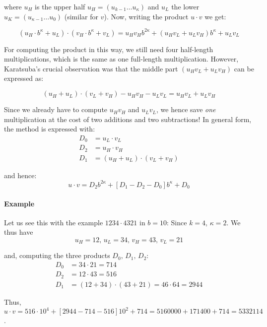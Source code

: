 where $u_H$ is the upper half $u_H = \left(u_{k-1} \ldots u_\kappa\right)$ and $u_L$ the lower $u_K = \left(u_{\kappa-1} \ldots u_0\right)$ (similar for $v$).
Now, writing the product $u \cdot v$ we get:

$$
 \left(u_H \cdot b^\kappa + u_L\right) \cdot \left(v_H \cdot b^\kappa + v_L\right) = u_H v_H b^{2 \kappa} + \left( u_H v_L + u_L v_H\right) b^\kappa + u_L v_L
$$

For computing the product in this way, we still need four half-length multiplications, which is the same as one full-length multiplication. However, Karatsuba's crucial observation was that the middle part $\left( u_H v_L + u_L v_H\right)$ can be expressed as:

$$
\left(u_H + u_L\right) \cdot \left(v_L + v_H\right) - u_H v_H - u_L v_L = u_H v_L + u_L v_H
$$

Since we already have to compute $u_H v_H$ and $u_L v_L$, we hence save \emph{one} multiplication at the cost of two additions and two subtractions! In general form, the method is expressed with:
\begin{align}
	D_0 &= u_L \cdot v_L \nonumber \\ 
	D_2 &= u_H \cdot v_H \nonumber \\ 
	D_1 &= \left(u_H + u_L\right) \cdot \left(v_L + v_H\right) \nonumber
\end{align}

and hence:
$$
u \cdot v = D_2 b^{2\kappa} + \left[D_1 - D_2 - D_0\right] b^\kappa + D_0
$$

\paragraph{Example}
Let us see this with the example $1234 \cdot 4321$ in $b = 10$: Since $k = 4$, $\kappa = 2$. We thus have 
$$
u_H = 12,\, u_L = 34,\,v_H = 43,\, v_L = 21
$$

and, computing the three products $D_0,\, D_1,\,D_2$:
\begin{align}
	D_0 &= 34 \cdot 21 = 714 \nonumber \\ 
	D_2 &= 12 \cdot 43 = 516 \nonumber \\ 
	D_1 &= \left(12 + 34\right) \cdot \left(43 + 21\right) = 46 \cdot 64 = 2944 \nonumber
\end{align}

Thus, $u \cdot v = 516\cdot 10^4 + \left[2944 - 714 - 516\right] 10^2 + 714 = 5160000 + 171400 + 714 = 5332114$.

